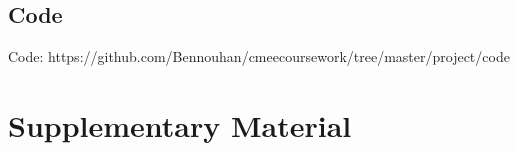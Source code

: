 \documentclass[11pt]{article}
\begin{document}
\subsection{Code}

Code: https://github.com/Bennouhan/cmeecoursework/tree/master/project/code




\newpage
\printbibliography[heading=bibintoc]
\newpage















\section*{Supplementary Material} %



\end{document}
